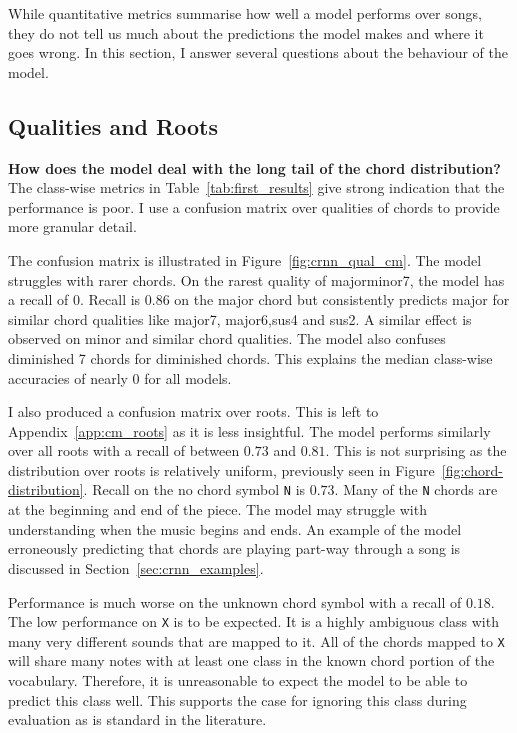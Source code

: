 While quantitative metrics summarise how well a model performs over songs, they do not tell us much about the predictions the model makes and where it goes wrong. In this section, I answer several questions about the behaviour of the model.

\subsection{Qualities and Roots}

\textbf{How does the model deal with the long tail of the chord distribution?} The class-wise metrics in Table~\ref{tab:first_results} give strong indication that the performance is poor. I use a confusion matrix over qualities of chords to provide more granular detail. 

The confusion matrix is illustrated in Figure~\ref{fig:crnn_qual_cm}. The model struggles with rarer chords. On the rarest quality of majorminor7, the model has a recall of $0$. Recall is $0.86$ on the major chord but consistently predicts major for similar chord qualities like major7, major6,sus4 and sus2. A similar effect is observed on minor and similar chord qualities. The model also confuses diminished 7 chords for diminished chords. This explains the median class-wise accuracies of nearly $0$ for all models.

I also produced a confusion matrix over roots. This is left to Appendix~\ref{app:cm_roots} as it is less insightful. The model performs similarly over all roots with a recall of between $0.73$ and $0.81$. This is not surprising as the distribution over roots is relatively uniform, previously seen in Figure~\ref{fig:chord-distribution}. Recall on the no chord symbol \texttt{N} is $0.73$. Many of the \texttt{N} chords are at the beginning and end of the piece. The model may struggle with understanding when the music begins and ends. An example of the model erroneously predicting that chords are playing part-way through a song is discussed in Section~\ref{sec:crnn_examples}.

Performance is much worse on the unknown chord symbol with a recall of $0.18$. The low performance on \texttt{X} is to be expected. It is a highly ambiguous class with many very different sounds that are mapped to it. All of the chords mapped to \texttt{X} will share many notes with at least one class in the known chord portion of the vocabulary. Therefore, it is unreasonable to expect the model to be able to predict this class well. This supports the case for ignoring this class during evaluation as is standard in the literature.

